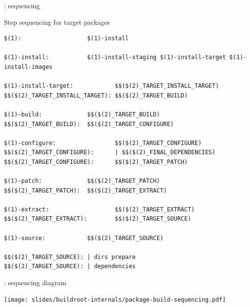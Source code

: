 \begin{frame}[fragile]{: sequencing}

\begin{block}{Step sequencing for target packages}
\begin{verbatim}
$(1):                   $(1)-install

$(1)-install:           $(1)-install-staging $(1)-install-target $(1)-install-images

$(1)-install-target:            $$($(2)_TARGET_INSTALL_TARGET)
$$($(2)_TARGET_INSTALL_TARGET): $$($(2)_TARGET_BUILD)

$(1)-build:             $$($(2)_TARGET_BUILD)
$$($(2)_TARGET_BUILD):  $$($(2)_TARGET_CONFIGURE)

$(1)-configure:                 $$($(2)_TARGET_CONFIGURE)
$$($(2)_TARGET_CONFIGURE):      | $$($(2)_FINAL_DEPENDENCIES)
$$($(2)_TARGET_CONFIGURE):      $$($(2)_TARGET_PATCH)

$(1)-patch:             $$($(2)_TARGET_PATCH)
$$($(2)_TARGET_PATCH):  $$($(2)_TARGET_EXTRACT)

$(1)-extract:                   $$($(2)_TARGET_EXTRACT)
$$($(2)_TARGET_EXTRACT):        $$($(2)_TARGET_SOURCE)

$(1)-source:            $$($(2)_TARGET_SOURCE)

$$($(2)_TARGET_SOURCE): | dirs prepare
$$($(2)_TARGET_SOURCE): | dependencies
\end{verbatim}
\end{block}

\end{frame}

\begin{frame}{: sequencing diagram}

\begin{center}
  \texttt{[image: slides/buildroot-internals/package-build-sequencing.pdf]}
\end{center}

\end{frame}

